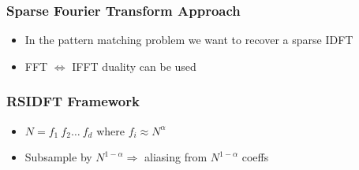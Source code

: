 \documentclass[10pt,xcolor=table]{beamer}
\begin{document}
\begin{frame}\frametitle{Sparse Fourier Transform Approach}
	\begin{figure}[t]
		\centering
		\scalebox{0.28}{}
	\end{figure}
\begin{itemize}
\item In the pattern matching problem we want to recover a sparse IDFT
\item FFT $\Leftrightarrow$ IFFT duality can be used
\end{itemize}
\end{frame}
\begin{frame}\frametitle{RSIDFT Framework}
	\begin{itemize}
    \item $N = f_1 \ f_2 \ldots \ f_d$ where $f_i \approx N^\alpha$
    \item Subsample by $N^{1-\alpha} \Rightarrow$ aliasing from $N^{1-\alpha}$ coeffs
    \end{itemize}
		\begin{figure}[t!]
			\begin{center}
				\resizebox{0.7\textwidth}{!}{}
			\end{center}	
			\label{fig:rsidft}
			\vspace{5 pt}
		\end{figure}
\end{frame}
\end{document}

